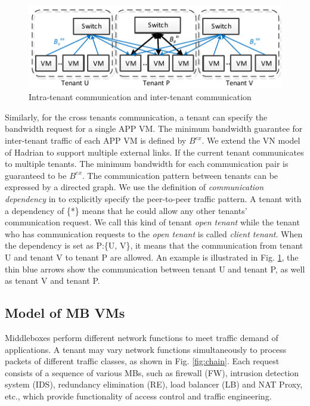\documentclass[review]{elsarticle}
\begin{document}
\begin{figure}
	\centering
		\includegraphics[width=3.5 in]{fig/tagmodel.pdf}
	\caption{Intra-tenant communication and inter-tenant communication}
	\label{fig:hose}
\end{figure}

Similarly, for the cross tenants communication, a tenant can specify the bandwidth request for a single APP VM. The minimum bandwidth guarantee for inter-tenant traffic of each APP VM is defined by $B^{ex}$. We extend the VN model of Hadrian \cite{B13cta} to support multiple external links. If the current tenant communicates to multiple tenants. The minimum bandwidth for each communication pair is guaranteed to be $B^{ex}$. The communication pattern between tenants can be expressed by a directed graph. We use the definition of \emph{communication dependency} in \cite{B13cta} to explicitly specify the peer-to-peer traffic pattern. A tenant with a dependency of \{*\} means that he could allow any other tenants' communication request. We call this kind of tenant \emph{open tenant} while the tenant who has communication requests to the \emph{open tenant} is called \emph{client tenant}. When the dependency is set as P:\{U, V\}, it means that the communication from tenant U and tenant V to tenant P are allowed. An example is illustrated in Fig. \ref{fig:hose}, the thin blue arrows show the communication between tenant U and tenant P, as well as tenant V and tenant P.




\subsection{Model of MB VMs}\label{sec:modelformb}

Middleboxes perform different network functions to meet traffic demand of applications. A tenant may vary network functions simultaneously to process packets of different traffic classes, as shown in Fig. \ref{fig:chain}. Each request consists of a sequence of various MBs, such as firewall (FW), intrusion detection system (IDS), redundancy elimination (RE), load balancer (LB) and NAT Proxy, etc., which provide functionality of access control and traffic engineering. 
\end{document}

